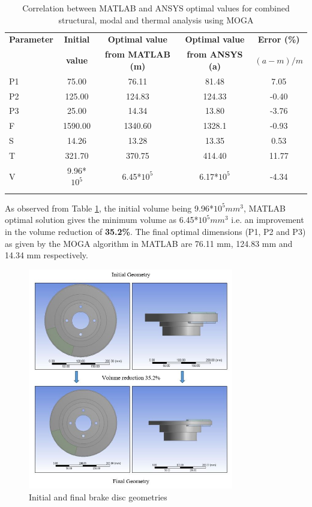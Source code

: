 \documentclass[12pt]{article}
\begin{document}
\begin{longtable}{|l|c|c|c|c|}
\hline 
\textbf{Parameter} & \textbf{Initial} & \textbf{Optimal value} & \textbf{Optimal value} & \textbf{Error (\%)} \\
 & \textbf{value} & \textbf{from MATLAB (m)} & \textbf{from ANSYS (a)} & \textbf{$(a-m)/m$}\\
\hline
P1 & 75.00 & 76.11 & 81.48 & 7.05 \\
\hline
P2 & 125.00 & 124.83 & 124.33 & -0.40 \\
\hline
P3 & 25.00 & 14.34 & 13.80 & -3.76\\
\hline
F & 1590.00 & 1340.60 & 1328.1 & -0.93 \\
\hline
S & 14.26  & 13.28 & 13.35 & 0.53 \\
\hline
T & 321.70  & 370.75 & 414.40 & 11.77 \\
\hline
V & 9.96*$10^{5}$ & 6.45*$10^{5}$ & 6.17*$10^{5}$ & -4.34 \\
\hline
\caption{Correlation between MATLAB and ANSYS optimal values for combined structural, modal and thermal analysis using MOGA}
\label{2con3}
\end{longtable}
As observed from Table \ref{2con3}, the initial volume being 9.96*$10^{5} mm^{3}$, MATLAB optimal solution gives the minimum volume as 6.45*$10^{5} mm^{3}$ i.e. an improvement in the volume reduction of \textbf{35.2\%}. The final optimal dimensions (P1, P2 and P3) as given by the MOGA algorithm in MATLAB are 76.11 mm, 124.83 mm and 14.34 mm respectively.
\begin{figure}[H]
\begin{center}
\includegraphics[width=0.8\textwidth]{geom.jpg}
\caption{Initial and final brake disc geometries}
\label{geom}
\end{center}
\end{figure}
\end{document}
